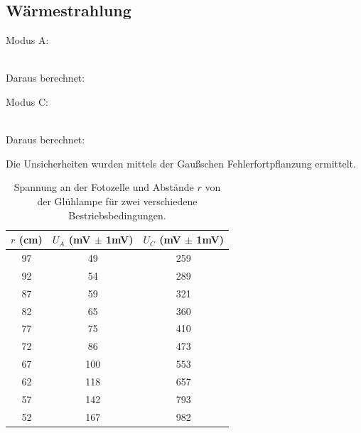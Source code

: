 \documentclass[12pt]{article}
\begin{document}
\subsection{Wärmestrahlung}

Modus A: \begin{center}

 \\

Daraus berechnet:\\
 \end{center}
Modus C: \begin{center}  \\

Daraus berechnet:\\
\end{center}
Die Unsicherheiten wurden mittels der Gaußschen Fehlerfortpflanzung ermittelt.\\
\begin{table}[H]
\begin{center}
\begin{tabular}{|c|c|c|}
\hline
$r$ (cm) & $U_A$ (mV $\pm$ 1mV) & $U_C$ (mV $\pm$ 1mV)\\
\hline
97 & 49 & 259 \\
92 & 54 & 289 \\
87 & 59 & 321 \\
82 & 65 & 360 \\
77 & 75 & 410 \\
72 & 86 & 473 \\
67 & 100 & 553 \\
62 & 118 & 657 \\
57 & 142 & 793 \\
52 & 167 & 982 \\
\hline
\hline
\end{tabular}
\caption{Spannung an der Fotozelle und Abstände $r$ von der Glühlampe für zwei verschiedene Bestriebsbedingungen.}
\end{center}
\end{table}
\end{document}
